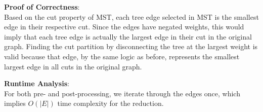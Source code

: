 \documentclass[11pt]{article}
\theoremstyle{definition}
\theoremstyle{remark}
\begin{document}
\noindent\textbf{Proof of Correctness}:\\
Based on the cut property of MST, each tree edge selected in MST is the smallest edge in their respective cut. Since the edges have negated weights, this would imply that each tree edge is actually the largest edge in their cut in the original graph. Finding the cut partition by disconnecting the tree at the largest weight is valid because that edge, by the same logic as before, represents the smallest largest edge in all cuts in the original graph.\bigskip

\noindent\textbf{Runtime Analysis}:\\
For both pre- and post-processing, we iterate through the edges once, which implies $O(|E|)$ time complexity for the reduction.
\end{document}
